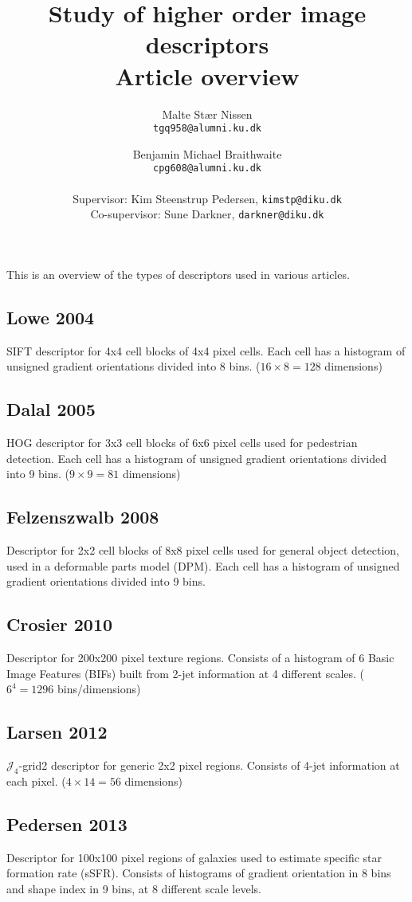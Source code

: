 \documentclass[11pt,a4paper]{article}
\title{\bfseries{Study of higher order image descriptors}\\Article overview}
\author{
    Malte Stær Nissen \\\texttt{tgq958@alumni.ku.dk}
    \and
    Benjamin Michael Braithwaite \\ \texttt{cpg608@alumni.ku.dk}
    \\
    \\ \small{Supervisor: Kim Steenstrup Pedersen, \texttt{kimstp@diku.dk}}
    \\ \small{Co-supervisor: Sune Darkner, \texttt{darkner@diku.dk}}
    }
\begin{document}
\maketitle

This is an overview of the types of descriptors used in various articles.

\subsection{Lowe 2004 \cite{lowe2004distinctive}}

SIFT descriptor for 4x4 cell blocks of 4x4 pixel cells. Each cell has a histogram of unsigned gradient orientations divided into 8 bins. ($16 \times 8 = 128$ dimensions)

\subsection{Dalal 2005 \cite{dalal2005histograms}}

HOG descriptor for 3x3 cell blocks of 6x6 pixel cells used for pedestrian detection. Each cell has a histogram of unsigned gradient orientations divided into 9 bins. ($9 \times 9 = 81$ dimensions)

\subsection{Felzenszwalb 2008 \cite{felzenszwalb2008discriminatively}}

Descriptor for 2x2 cell blocks of 8x8 pixel cells used for general object detection, used in a deformable parts model (DPM). Each cell has a histogram of unsigned gradient orientations divided into 9 bins.

\subsection{Crosier 2010 \cite{crosier2010using}}

Descriptor for 200x200 pixel texture regions. Consists of a histogram of 6 Basic Image Features (BIFs) built from 2-jet information at 4 different scales. ($6^4 = 1296$ bins/dimensions)

\subsection{Larsen 2012 \cite{larsen2012jet}}

$\mathcal{J}_4$-grid2 descriptor for generic 2x2 pixel regions. Consists of 4-jet information at each pixel. ($4 \times 14 = 56$ dimensions)

\subsection{Pedersen 2013 \cite{pedersen2013shape}}

Descriptor for 100x100 pixel regions of galaxies used to estimate specific star formation rate (sSFR). Consists of histograms of gradient orientation in 8 bins and shape index in 9 bins, at 8 different scale levels.



\end{document}
